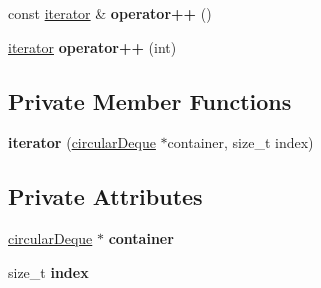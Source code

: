 \begin{DoxyCompactItemize}
\item 
\hypertarget{classcircularDeque_1_1iterator_a54abaeb1841ae8384be053ca64d75e03}{const \hyperlink{classcircularDeque_1_1iterator}{iterator} \& {\bfseries operator++} ()}\label{classcircularDeque_1_1iterator_a54abaeb1841ae8384be053ca64d75e03}

\item 
\hypertarget{classcircularDeque_1_1iterator_a770427aacdfea8b4f452bde2a38fe622}{\hyperlink{classcircularDeque_1_1iterator}{iterator} {\bfseries operator++} (int)}\label{classcircularDeque_1_1iterator_a770427aacdfea8b4f452bde2a38fe622}

\end{DoxyCompactItemize}
\subsection*{Private Member Functions}
\begin{DoxyCompactItemize}
\item 
\hypertarget{classcircularDeque_1_1iterator_a137521582461a1f2fee4f600173ba789}{{\bfseries iterator} (\hyperlink{classcircularDeque}{circular\+Deque} $\ast$container, size\+\_\+t index)}\label{classcircularDeque_1_1iterator_a137521582461a1f2fee4f600173ba789}

\end{DoxyCompactItemize}
\subsection*{Private Attributes}
\begin{DoxyCompactItemize}
\item 
\hypertarget{classcircularDeque_1_1iterator_a6df5ff5d1f6afe89b6e7c070c07b8d1c}{\hyperlink{classcircularDeque}{circular\+Deque} $\ast$ {\bfseries container}}\label{classcircularDeque_1_1iterator_a6df5ff5d1f6afe89b6e7c070c07b8d1c}

\item 
\hypertarget{classcircularDeque_1_1iterator_a099c533da98b34ee5415675fd905dc36}{size\+\_\+t {\bfseries index}}\label{classcircularDeque_1_1iterator_a099c533da98b34ee5415675fd905dc36}

\end{DoxyCompactItemize}
